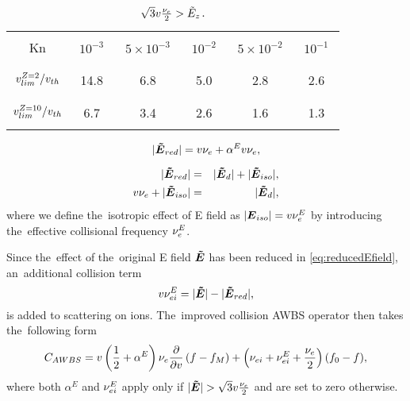 
\begin{table}
\begin{center}
  \begin{tabular}{c|ccccc}
    \hline\hline\\
    Kn & $\,\,10^{-3}\,\,$ & $\,\,5\times10^{-3}\,\,$ & $\,\,10^{-2}\,\,$ & $\,\,5\times10^{-2}\,\,$ & $\,\,10^{-1}\,\,$ \\\\
    \hline\\
    $v_{lim}^{Z=2} / v_{th}$ & 14.8 & 6.8 & 5.0 & 2.8 & 2.6 \\\\
    \hline\\
    $v_{lim}^{Z=10} / v_{th}$ & 6.7 & 3.4 & 2.6 & 1.6 & 1.3 \\\\
    \hline\hline
  \end{tabular}
  \caption{
  $\sqrt{3}v\frac{\nu_{e}}{2} > \tilde{E}_z$.
  }
\end{center}
\label{tab:vlim}
\end{table}

\begin{equation}
  |\boldsymbol{\tilde{E}}_{red}| = v \nu_{e} + \alpha^E v \nu_{e} ,
  \label{eq:reducedEfield}
\end{equation}

\begin{eqnarray}
  |\boldsymbol{\tilde{E}}_{red}| &=& |\boldsymbol{\tilde{E}}_{d}| + |\boldsymbol{\tilde{E}}_{iso}| ,
  \nonumber \\
  v \nu_{e} + |\boldsymbol{\tilde{E}}_{iso}| &=& |\boldsymbol{\tilde{E}}_{d}| ,
  \nonumber 
\end{eqnarray}
where we define the~isotropic effect of E field as
$|\boldsymbol{E}_{iso}| = v \nu_{e}^E$ by introducing the~effective collisional 
frequency $\nu_{e}^E$.

Since the~effect of the~original E field $\boldsymbol{\tilde{E}}$ has been reduced in 
\eqref{eq:reducedEfield}, an~additional collision term
\begin{equation}
  v \nu_{ei}^E = |\boldsymbol{\tilde{E}}| - |\boldsymbol{\tilde{E}}_{red}| ,
  \nonumber
\end{equation}
is added to scattering on ions. The~improved collision AWBS operator then takes 
the~following form
\begin{equation}
  C_{AWBS} = v \left(\frac{1}{2} + \alpha^E\right)\nu_{e} \frac{\partial{}}{\partial{v}}
  \left(f - f_M \right) 
  + \left(\nu_{ei} + \nu_{ei}^E + \frac{\nu_{e}}{2}\right) (f_0 - f) ,
  \nonumber
\end{equation}
where both $\alpha^E$ and $\nu_{ei}^E$ apply only if 
$|\boldsymbol{\tilde{E}}| > \sqrt{3} v \frac{\nu_{e}}{2}$ 
and are set to zero otherwise.

